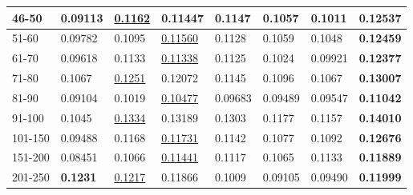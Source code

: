 \begin{table}[]
\begin{tabular}{|l|l|l|l|l|l|l||l|}
        46-50       & 0.09113                        & \underline{0.1162}             & 0.11447                        & 0.1147                         & 0.1057                         & 0.1011                          & \textbf{0.12537}           \\ \hline
        51-60       & 0.09782                        & 0.1095                         & \underline{0.11560}            & 0.1128                         & 0.1059                         & 0.1048                          & \textbf{0.12459}           \\ \hline
        61-70       & 0.09618                        & 0.1133                         & \underline{0.11338}            & 0.1125                         & 0.1024                         & 0.09921                         & \textbf{0.12377}           \\ \hline
        71-80       & 0.1067                         & \underline{0.1251}             & 0.12072                        & 0.1145                         & 0.1096                         & 0.1067                          & \textbf{0.13007}           \\ \hline
        81-90       & 0.09104                        & 0.1019                         & \underline{0.10477}            & 0.09683                        & 0.09489                        & 0.09547                         & \textbf{0.11042}           \\ \hline
        91-100      & 0.1045                         & \underline{0.1334}             & 0.13189                        & 0.1303                         & 0.1177                         & 0.1157                          & \textbf{0.14010}           \\ \hline
        101-150     & 0.09488                        & 0.1168                         & \underline{0.11731}            & 0.1142                         & 0.1077                         & 0.1092                          & \textbf{0.12676}           \\ \hline
        151-200     & 0.08451                        & 0.1066                         & \underline{0.11441}            & 0.1117                         & 0.1065                         & 0.1133                          & \textbf{0.11889}           \\ \hline
        201-250     & \textbf{0.1231}                & \underline{0.1217}             & 0.11866                        & 0.1009                         & 0.09105                        & 0.09490                         & \textbf{0.11999}           \\ \hline

\end{tabular}
\end{table}

